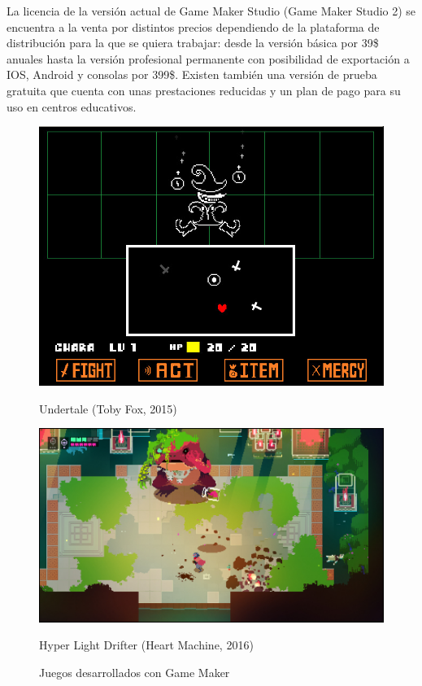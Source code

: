 La licencia de la versión actual de Game Maker Studio (Game Maker Studio 2) se encuentra a la venta por distintos precios dependiendo de la plataforma de distribución para la que se quiera trabajar: desde la versión básica por 39\$ anuales hasta la versión profesional permanente con posibilidad de exportación a IOS, Android y consolas por 399\$. Existen también una versión de prueba gratuita que cuenta con unas prestaciones reducidas y un plan de pago para su uso en centros educativos. 
\begin{figure}[!htb]
   \begin{minipage}{0.5\textwidth}
     \centering
     \includegraphics[width=0.85\linewidth, right]{images/estadodelarte/motores/undertale}
     \caption{Undertale (Toby Fox, 2015)}
   \end{minipage}\hfill
   \begin {minipage}{0.5\textwidth}
     \centering
     \includegraphics[width=0.85\linewidth, left]{images/estadodelarte/motores/hyper-light-drifter}
     \caption{Hyper Light Drifter (Heart Machine, 2016)}
   \end{minipage}
   \caption{Juegos desarrollados con Game Maker}
\end{figure}
